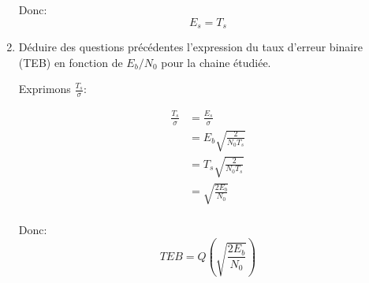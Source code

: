 \documentclass[frenchb]{article}
\begin{document}
\begin{enumerate}
        Donc:
        $$\boxed{E_s = T_s} $$
        \par\leavevmode\par
        \item Déduire des questions précédentes l'expression du taux d'erreur binaire (TEB) en fonction de $E_b/N_0$ pour la chaine étudiée.
        
        \par\leavevmode\par
        \setlength\parindent{0.5cm}
        Exprimons $\frac{T_s}{\sigma}$:
        
        \begin{equation*}
        \begin{split}
        \frac{T_s}{\sigma} &= \frac{E_s}{\sigma} \\
        & = E_b \sqrt{\frac{2}{N_0 T_s}} \\
        & = T_s \sqrt{\frac{2}{N_0 T_s}} \\
        & = \sqrt{\frac{2 E_b}{N_0}} \\
        \end{split}
        \end{equation*}
        
        Donc:
        $$ \boxed{TEB = Q\left(\sqrt{\frac{2 E_b}{N_0}}\right)} $$
        

\end{enumerate}
\end{document}
